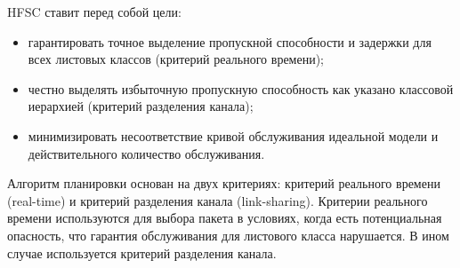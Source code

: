         HFSC ставит перед собой цели:
        \begin{itemize}
            \item гарантировать точное выделение пропускной способности и задержки для всех листовых классов (критерий реального времени);
            \item честно выделять избыточную пропускную способность как указано классовой иерархией (критерий разделения канала);
            \item минимизировать несоответствие кривой обслуживания идеальной модели и действительного количество обслуживания.\cite{tchfsc}
        \end{itemize}

        Алгоритм планировки основан на двух критериях: критерий реального времени
        (real-time) и критерий разделения канала (link-sharing). Критерии реального времени
        используются для выбора пакета в условиях, когда есть потенциальная опасность,
        что гарантия обслуживания для листового класса нарушается. В ином случае
        используется критерий разделения канала.\cite{tchfsc}

